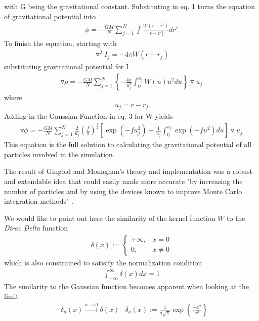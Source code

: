 \documentclass{sigchi}
\begin{document}
with G being the gravitational constant. Substituting in eq. 1 turns the equation 
of gravitational potential into
\begin{align}
\phi = - \frac{GM}{N} \sum_{j=1}^N \int \frac{W(r - r')}{|r - r'|} dr'
\end{align}
To finish the equation, starting with
\begin{align}
\triangledown^2I_j = -4 \pi W(r - r_j)
\end{align}
substituting gravitational potential for I
\begin{align}
\triangledown \rho = - \frac{GM}{N} \sum_{j=1}^N \left \lbrace - \frac{4 \pi}{u_j^2} \int_{0}^{u_j} 
W(u) u^2 du \right \rbrace \triangledown u_j
\end{align}
where
\begin{align}
u_j = r - r_j
\end{align}
Adding in the Gaussian Function in eq. 3 for W yields
\begin{align}
\triangledown \phi = - \frac{GM}{N} \sum_{j=1}^N \frac{2}{u_j} \left ( \frac{f}{\pi} \right )^\frac{1}{2} 
\left \lbrack \exp{(-f u_j^2)} - \frac{1}{u_j} \int_{0}^{u_j} \exp{(-f u^2)} du \right \rbrack 
\triangledown u_j
\end{align}
This equation is the full solution to calculating the gravitational potential of all particles
involved in the simulation.
\par\medskip
%
The result of Gingold and Monaghan's theory and implementation was a robust 
and extendable idea that could easily made more accurate "by increasing the number of particles 
and by using the devices known to improve Monte Carlo integration methods" \cite{sphastrophysics}.
\par\medskip
%
We would like to point out here the similarity of the kernel function $W$ to the \emph{Dirac Delta} function
\begin{align*}
	\delta(x) := 
	\begin{cases}
		+ \infty, & x =0 \\
		0 , & x \neq 0
	\end{cases}
\end{align*}
which is also constrained to satisify the normalization condition
\begin{align*}
	\int_{-\infty}^\infty \delta (x) dx = 1
\end{align*}
The similarity to the Gaussian function becomes apparent when looking at the limit
\begin{align*}
	&\delta_a (x) \xrightarrow{a \rightarrow 0} \delta(x)
	&\delta_a (x) := \frac{1}{a \sqrt{\pi}} \exp \left\{ \frac{-x^2}{a^2} \right\}
\end{align*}
\end{document}
